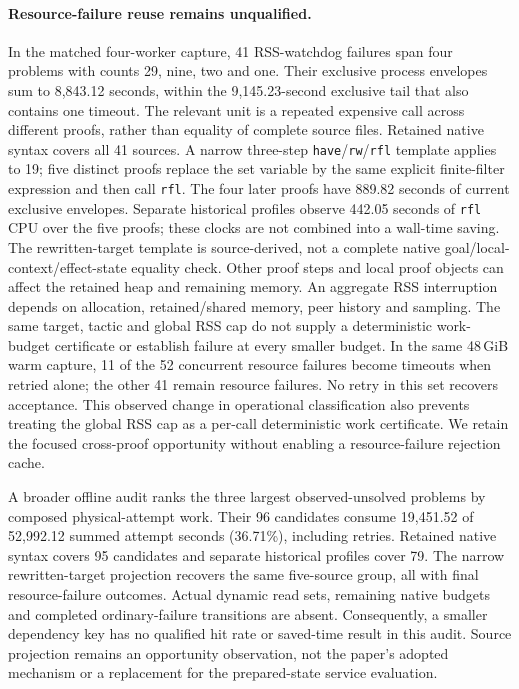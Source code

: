 \documentclass[10pt,twocolumn]{article}
\begin{document}
\paragraph{Resource-failure reuse remains unqualified.}
In the matched four-worker capture, 41 RSS-watchdog failures span four
problems with counts 29, nine, two and one. Their exclusive process envelopes
sum to 8,843.12 seconds, within the 9,145.23-second exclusive tail that also
contains one timeout.
The relevant unit is a repeated expensive call across different proofs,
rather than equality of complete source files. Retained native syntax covers
all 41 sources. A narrow three-step \texttt{have}/\texttt{rw}/\texttt{rfl}
template applies to 19; five distinct proofs replace the set variable by the
same explicit finite-filter expression and then call \texttt{rfl}.
The four later proofs have 889.82 seconds of current exclusive envelopes.
Separate historical profiles observe 442.05 seconds of \texttt{rfl} CPU over
the five proofs; these clocks are not combined into a wall-time saving.
The rewritten-target template is source-derived, not a complete native
goal/local-context/effect-state equality check. Other proof steps and local
proof objects can affect the retained heap and remaining memory.
An aggregate RSS interruption depends on allocation, retained/shared memory,
peer history and sampling. The same target, tactic and global RSS cap do not
supply a deterministic work-budget certificate or establish failure at every
smaller budget. In the same 48\,GiB warm capture, 11 of the 52 concurrent
resource failures become timeouts when retried alone; the other 41 remain
resource failures. No retry in this set recovers acceptance. This observed
change in operational classification also prevents treating the global RSS
cap as a per-call deterministic work certificate. We retain the focused
cross-proof opportunity without enabling a resource-failure rejection cache.

A broader offline audit ranks the three largest observed-unsolved problems
by composed physical-attempt work. Their 96 candidates consume 19,451.52 of
52,992.12 summed attempt seconds (36.71\%), including retries.
Retained native syntax covers 95 candidates and separate historical profiles
cover 79. The narrow rewritten-target projection recovers the same five-source
group, all with final resource-failure outcomes. Actual dynamic read sets,
remaining native budgets and completed ordinary-failure transitions are absent.
Consequently, a smaller dependency key has no qualified hit rate or saved-time
result in this audit. Source projection remains an opportunity observation,
not the paper's adopted mechanism or a replacement for the prepared-state
service evaluation.
\end{document}
